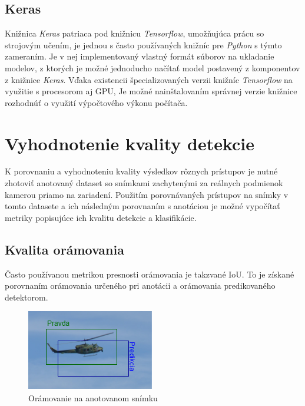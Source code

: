     \section{Keras}
        Knižnica \emph{Keras} patriaca pod knižnicu \emph{Tensorflow}, umožňujúca prácu so strojovým učením, je jednou s často používaných knižníc pre \emph{Python} s týmto zameraním. Je v nej implementovaný vlastný formát súborov na ukladanie modelov, z ktorých je možné jednoducho načítať model postavený z komponentov z knižnice \emph{Keras}. Vďaka existencii špecializovaných verzii knižníc \emph{Tensorflow} na využitie s procesorom aj GPU, Je možné nainštalovaním správnej verzie knižnice rozhodnúť o využití výpočtového výkonu počítača.

\chapter{Vyhodnotenie kvality detekcie}
    K porovnaniu a vyhodnoteniu kvality výsledkov rôznych prístupov je nutné zhotoviť anotovaný dataset so snímkami zachytenými za reálnych podmienok kamerou priamo na zariadení. Použitím porovnávaných prístupov na snímky v tomto datasete a ich následným porovnaním s anotáciou je možné vypočítať metriky popisujúce ich kvalitu detekcie a klasifikácie.

    \section{Kvalita orámovania}
        Často používanou metrikou presnosti orámovania je takzvané \ac{IoU}. To je získané porovnaním orámovania určeného pri anotácii a orámovania predikovaného detektorom.

        \begin{figure}[h]
            \centering
            \includegraphics[width=.6\textwidth]{obrazky/metrics/detection.drawio.png}
            \caption{Orámovanie na anotovanom snímku}
        \end{figure}

